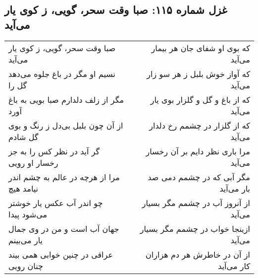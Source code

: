 \begin{center}
\section*{غزل شماره ۱۱۵: صبا وقت سحر، گویی، ز کوی یار می‌آید}
\label{sec:115}
\begin{longtable}{l p{0.5cm} r}
صبا وقت سحر، گویی، ز کوی یار می‌آید
&&
که بوی او شفای جان هر بیمار می‌آید
\\
نسیم او مگر در باغ جلوه می‌دهد گل را
&&
که آواز خوش بلبل ز هر سو زار می‌آید
\\
مگر از زلف دلدارم صبا بویی به باغ آورد
&&
که از باغ و گل و گلزار بوی یار می‌آید
\\
از آن چون بلبل بی‌دل ز رنگ و بوی گل شادم
&&
که از گلزار در چشمم رخ دلدار می‌آید
\\
گر آید در نظر کس را به جز رخسار او رویی
&&
مرا باری نظر دایم بر آن رخسار می‌آید
\\
مرا از هرچه در عالم به چشم اندر نیامد هیچ
&&
مگر آبی که در چشمم دمی صد بار می‌آید
\\
چو اندر آب عکس یار خوشتر می‌شود پیدا
&&
از آنروز آب در چشمم مگر بسیار می‌آید
\\
جهان آب است و من در وی جمال یار می‌بینم
&&
ازینجا خواب در چشمم مگر بسیار می‌آید
\\
عراقی در چنین خوابی همی بیند چنان رویی
&&
از آن در خاطرش هر دم هزاران کار می‌آید
\\
\end{longtable}
\end{center}

